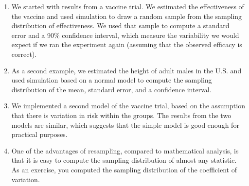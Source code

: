 \begin{enumerate}
\def\labelenumi{\arabic{enumi}.}
\item
  We started with results from a vaccine trial. We estimated the
  effectiveness of the vaccine and used simulation to draw a random
  sample from the sampling distribution of effectiveness. We used that
  sample to compute a standard error and a 90\% confidence interval,
  which measure the variability we would expect if we ran the experiment
  again (assuming that the observed efficacy is correct).
\item
  As a second example, we estimated the height of adult males in the
  U.S. and used simulation based on a normal model to compute the
  sampling distribution of the mean, standard error, and a confidence
  interval.
\item
  We implemented a second model of the vaccine trial, based on the
  assumption that there is variation in risk within the groups. The
  results from the two models are similar, which suggests that the
  simple model is good enough for practical purposes.
\item
  One of the advantages of resampling, compared to mathematical
  analysis, is that it is easy to compute the sampling distribution of
  almost any statistic. As an exercise, you computed the sampling
  distribution of the coefficient of variation.
\end{enumerate}
